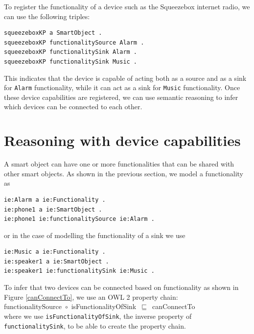 To register the functionality of a device such as the Squeezebox internet radio, we can use the following triples:

\begin{verbatim}
squeezeboxKP a SmartObject .
squeezeboxKP functionalitySource Alarm .
squeezeboxKP functionalitySink Alarm .
squeezeboxKP functionalitySink Music .	
\end{verbatim}

This indicates that the device is capable of acting both as a source and as a sink for \texttt{Alarm} functionality, while it can act as a sink for \texttt{Music} functionality. Once these device capabilities are registered, we can use semantic reasoning to infer which devices can be connected to each other.



\section{Reasoning with device capabilities}
\label{ReasoningCapabilities}
A smart object can have one or more functionalities that can be shared with other smart objects. As shown in the previous section, we model a functionality as 

\begin{verbatim}               
ie:Alarm a ie:Functionality .
ie:phone1 a ie:SmartObject .
ie:phone1 ie:functionalitySource ie:Alarm . 
\end{verbatim}

or in the case of modelling the functionality of a sink we use

\begin{verbatim}               
ie:Music a ie:Functionality .
ie:speaker1 a ie:SmartObject .
ie:speaker1 ie:functionalitySink ie:Music . 
\end{verbatim}

To infer that two devices can be connected based on functionality as shown in Figure \ref{canConnectTo}, we use an \ac{OWL} 2 property chain:\\

\noindent
functionalitySource~\ensuremath{\circ}~isFunctionalityOfSink~\ensuremath{\sqsubseteq}~canConnectTo\\%
\noindent
where we use \texttt{isFunctionalityOfSink}, the inverse property of \texttt{func\-tion\-al\-i\-ty\-Sink}, to be able to create the property chain.

